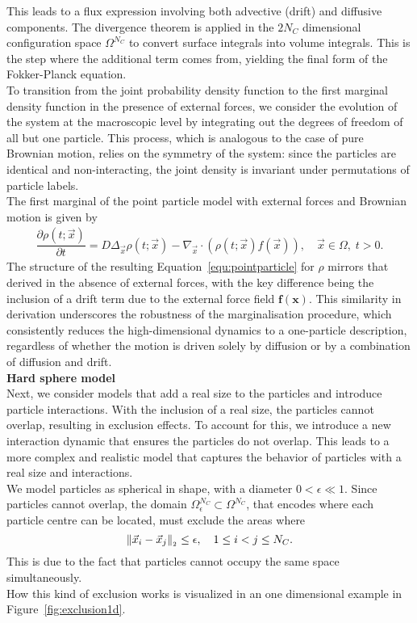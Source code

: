 This leads to a flux expression involving both advective (drift) and diffusive components. 
The divergence theorem is applied in the $2 N_C$ dimensional configuration space $\Omega^{N_C}$ to convert surface integrals into volume integrals.
This is the step where the additional term comes from, yielding the final form of the Fokker-Planck equation. \\
To transition from the joint probability density function to the first marginal density function in the presence of external forces, we consider the evolution of the system at the macroscopic level by integrating out the degrees of freedom of all but one particle. 
This process, which is analogous to the case of pure Brownian motion, relies on the symmetry of the system: since the particles are identical and non-interacting, the joint density is invariant under permutations of particle labels. \\
The first marginal of the point particle model with external forces and Brownian motion is given by 
\begin{align}
	\dfrac{\partial \rho (t; \vec{x})}{\partial t} = D \Delta_{\vec{x}} \rho(t; \vec{x}) - \nabla_{\vec{x}} \cdot (\rho(t; \vec{x}) f(\vec{x}) ), \quad \vec{x} \in \Omega, \; t>0.
	\label{equ:pointparticle}
\end{align}
The structure of the resulting Equation~\eqref{equ:pointparticle} for $\rho$ mirrors that derived in the absence of external forces, with the key difference being the inclusion of a drift term due to the external force field $\mathbf{f}(\mathbf{x})$. 
This similarity in derivation underscores the robustness of the marginalisation procedure, which consistently reduces the high-dimensional dynamics to a one-particle description, regardless of whether the motion is driven solely by diffusion or by a combination of diffusion and drift. \\


\textbf{Hard sphere model} \\
Next, we consider models that add a real size to the particles and introduce particle interactions. 
With the inclusion of a real size, the particles cannot overlap, resulting in exclusion effects. 
To account for this, we introduce a new interaction dynamic that ensures the particles do not overlap. 
This leads to a more complex and realistic model that captures the behavior of particles with a real size and interactions. \\
We model particles as spherical in shape, with a diameter $0 < \epsilon \ll 1$. 
Since particles cannot overlap, the domain $\Omega_{\epsilon}^{N_C} \subset \Omega^{N_C}$, that encodes where each particle centre can be located, must exclude the areas where \[ \norm[\vec{x}_i - \vec{x}_j] \leq \epsilon, \quad 1 \leq i < j \leq N_C.\] 
This is due to the fact that particles cannot occupy the same space simultaneously. \\
How this kind of exclusion works is visualized in an one dimensional example in Figure~\ref{fig:exclusion1d}.  



